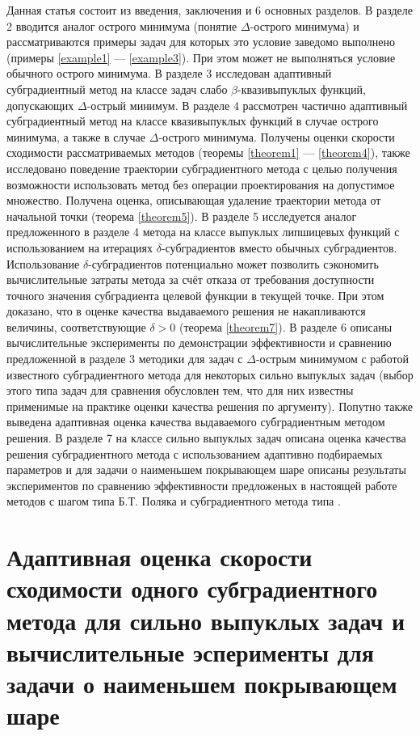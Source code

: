     Данная статья состоит из введения, заключения и 6 основных разделов. В разделе 2 вводится аналог острого минимума (понятие $\Delta$-острого минимума) и рассматриваются примеры задач для которых это условие заведомо выполнено (примеры \ref{example1} --- \ref{example3}). При этом может не выполняться условие обычного острого минимума. В разделе 3 исследован адаптивный субградиентный метод на классе задач слабо $\beta$-квазивыпуклых функций, допускающих $\Delta$-острый минимум. В разделе 4 рассмотрен частично адаптивный субградиентный метод на классе квазивыпуклых функций в случае острого минимума, а также в случае $\Delta$-острого минимума. Получены оценки скорости сходимости рассматриваемых методов (теоремы \ref{theorem1} --- \ref{theorem4}), также исследовано поведение траектории субградиентного метода с целью получения возможности использовать метод без операции проектирования на допустимое множество. Получена оценка, описывающая удаление  траектории метода от начальной точки (теорема \ref{theorem5}). В разделе 5 исследуется аналог предложенного в разделе 4 метода на классе выпуклых липшицевых функций с использованием на итерациях $\delta$-субградиентов вместо обычных субградиентов. Использование $\delta$-субградиентов потенциально может позволить сэкономить вычислительные затраты метода за счёт отказа от требования доступности точного значения субградиента целевой функции в текущей точке. При этом доказано, что в оценке качества выдаваемого решения не накапливаются величины, соответствующие $\delta > 0$ (теорема \ref{theorem7}). В разделе 6 описаны вычислительные эксперименты по демонстрации эффективности и сравнению предложенной в разделе 3 методики для задач с $\Delta$-острым минимумом с работой известного субградиентного метода \cite{Bach_2012} для некоторых сильно выпуклых задач (выбор этого типа задач для сравнения обусловлен тем, что для них известны применимые на практике оценки качества решения по аргументу). Попутно также выведена адаптивная оценка качества выдаваемого субградиентным методом \cite{Bach_2012} решения. В разделе 7 на классе сильно выпуклых задач описана оценка качества решения субградиентного метода \cite{Bach_2012} с использованием адаптивно подбираемых параметров и для задачи о наименьшем покрывающем шаре описаны результаты экспериментов по сравнению эффективности предложеных в настоящей работе методов с шагом типа Б.Т. Поляка и субградиентного метода типа \cite{Bach_2012}.

\section{Адаптивная оценка скорости сходимости одного субградиентного метода для сильно выпуклых задач и вычислительные эсперименты для задачи о наименьшем покрывающем шаре}  \label{sec:ch3/sec2}

